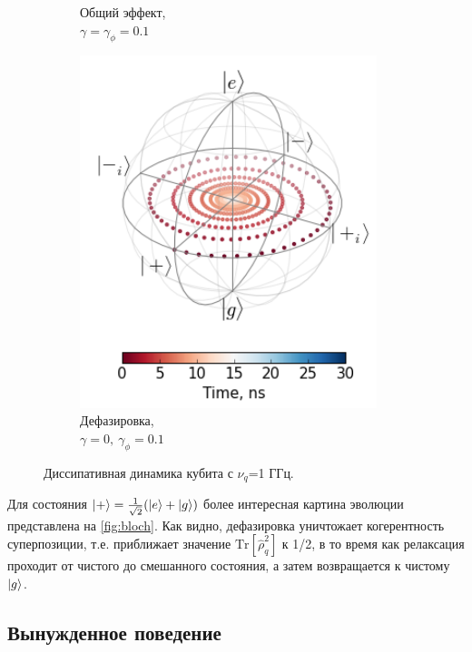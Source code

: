 \documentclass[12pt, twoside]{report}
\newcommand{\Tr}[1]{\text{Tr}\left[#1\right]}
\DeclarePairedDelimiter\ket{\lvert}{\rangle}
\numberwithin{equation}{section}
\numberwithin{figure}{section}
\begin{document}
\begin{figure}[h]
\begin{subfigure}[t]{0.32\textwidth}
\caption{Общий эффект, \\$\gamma = \gamma_\phi = 0.1$}
\end{subfigure}
\begin{subfigure}[t]{0.32\textwidth}
\centering
\includegraphics[width=0.95\textwidth]{Pictures/bloch_deph}
\caption{Дефазировка, \\ $\gamma = 0,\ \gamma_\phi = 0.1$}
\end{subfigure}
\caption{Диссипативная динамика кубита с $\nu_q$=1 ГГц.}
\label{fig:bloch}
\end{figure}

Для состояния $\ket{+} = \frac{1}{\sqrt{2}}(\ket{e}+\ket{g})$ более интересная картина эволюции представлена на \autoref{fig:bloch}. Как видно, дефазировка уничтожает когерентность суперпозиции, т.е. приближает значение $\Tr{\hat \rho_q^2}$ к 1/2, в то время как релаксация проходит от чистого до смешанного состояния, а затем возвращается к чистому $\ket{g}$.


\subsection{Вынужденное поведение} \label{subsec:driven_qubit}
\end{document}
